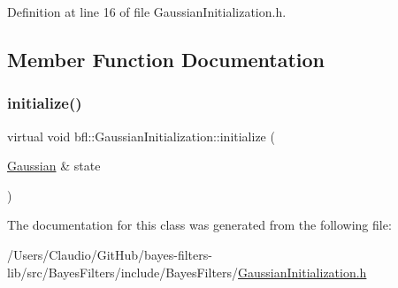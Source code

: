 Definition at line 16 of file Gaussian\+Initialization.\+h.



\subsection{Member Function Documentation}
\mbox{\label{classbfl_1_1GaussianInitialization_ae1ef36cd233e10547778b3b339009c69}} 
\subsubsection{\texorpdfstring{initialize()}{initialize()}}
{\footnotesize\ttfamily virtual void bfl\+::\+Gaussian\+Initialization\+::initialize (\begin{DoxyParamCaption}\item[{\mbox{\hyperlink{classbfl_1_1Gaussian}{Gaussian}} \&}]{state }\end{DoxyParamCaption})\hspace{0.3cm}{\ttfamily [pure virtual]}}



The documentation for this class was generated from the following file\+:\begin{DoxyCompactItemize}
\item 
/\+Users/\+Claudio/\+Git\+Hub/bayes-\/filters-\/lib/src/\+Bayes\+Filters/include/\+Bayes\+Filters/\mbox{\hyperlink{GaussianInitialization_8h}{Gaussian\+Initialization.\+h}}\end{DoxyCompactItemize}
